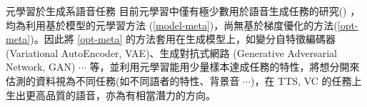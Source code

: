 \documentclass[12pt,UTF8,fntef]{article}
\begin{document}
\begin{section}{元學習於生成系語音任務}
  目前元學習中僅有極少數用於語音生成任務的研究(\cite{chen2018sample, serra2019blow}) ，均為利用基於模型的元學習方法 (\ref{model-meta})，尚無基於梯度優化的方法(\ref{opt-meta})。因此將 \ref{opt-meta} 的方法套用在生成模型上，如變分自特徵編碼器 (Variational AutoEncoder, VAE)、生成對抗式網路 (Generative Adversarial Network, GAN) $\cdots$ 等，並利用元學習能用少量樣本達成任務的特性，將想分開來估測的資料視為不同任務(如不同語者的特性、背景音 $\cdots$)，在 TTS, VC 的任務上生出更高品質的語音，亦為有相當潛力的方向。
\end{section}





\end{document}
